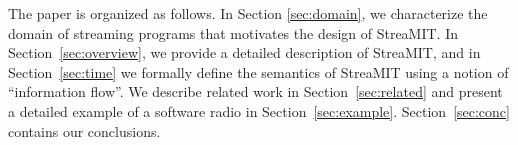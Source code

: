 The paper is organized as follows. In Section {\ref{sec:domain}}, we
characterize the domain of streaming programs that motivates the
design of StreaMIT.  In Section~\ref{sec:overview}, we provide a
detailed description of StreaMIT, and in Section~\ref{sec:time} we
formally define the semantics of StreaMIT using a notion of
``information flow''. We describe related work in
Section~\ref{sec:related} and present a detailed example of a software
radio in Section~\ref{sec:example}.  Section~\ref{sec:conc} contains
our conclusions.


